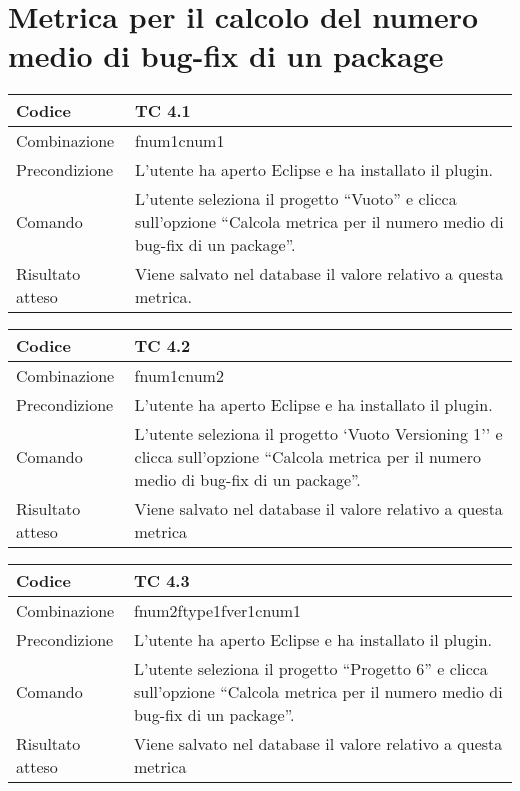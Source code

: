 \clearpage

\section{Metrica per il calcolo del numero medio di bug-fix di un package}

\begin{table}[ht]
\begin{tabular}{|p{3cm}|p{9cm}|}
\hline
\cellcolor{lightgray}Codice				& TC 4.1								\\
\hline
\cellcolor{lightgray}Combinazione		& fnum1cnum1									\\
\hline
\cellcolor{lightgray}Precondizione		& L'utente ha aperto Eclipse e ha installato il plugin.		\\
\hline
\cellcolor{lightgray}Comando			& L'utente seleziona il progetto ``Vuoto''  e clicca sull'opzione ``Calcola metrica per il numero medio di bug-fix di un package''.	\\
\hline
\cellcolor{lightgray}Risultato atteso	& Viene salvato nel database il valore relativo a questa metrica.\\
\hline
\end{tabular}
\end{table}

\begin{table}[ht]
\begin{tabular}{|p{3cm}|p{9cm}|}
\hline
\cellcolor{lightgray}Codice				& TC 4.2								\\
\hline
\cellcolor{lightgray}Combinazione		& fnum1cnum2 									\\
\hline
\cellcolor{lightgray}Precondizione		& L'utente ha aperto Eclipse e ha installato il plugin.				\\
\hline
\cellcolor{lightgray}Comando			& L'utente seleziona il progetto `Vuoto Versioning 1''  e clicca sull'opzione ``Calcola metrica per il numero medio di bug-fix di un package''.	\\
\hline
\cellcolor{lightgray}Risultato atteso	& Viene salvato nel database il valore relativo a questa metrica	\\
\hline
\end{tabular}
\end{table}

\begin{table}[ht]
\begin{tabular}{|p{3cm}|p{9cm}|}
\hline
\cellcolor{lightgray}Codice				& TC 4.3								\\
\hline
\cellcolor{lightgray}Combinazione		& fnum2ftype1fver1cnum1									\\
\hline
\cellcolor{lightgray}Precondizione		& L'utente ha aperto Eclipse e ha installato il plugin.					\\
\hline
\cellcolor{lightgray}Comando			& L'utente seleziona il progetto ``Progetto 6''  e clicca sull'opzione ``Calcola metrica per il numero medio di bug-fix di un package''.	\\
\hline
\cellcolor{lightgray}Risultato atteso	& Viene salvato nel database il valore relativo a questa metrica	\\
\hline
\end{tabular}
\end{table}

